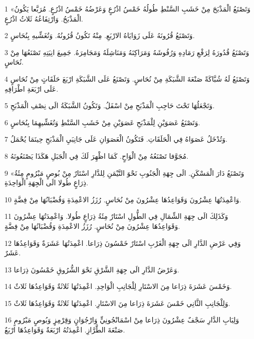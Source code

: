 \par 1 «وَتَصْنَعُ الْمَذْبَحَ مِنْ خَشَبِ السَّنْطِ طُولُهُ خَمْسُ اذْرُعٍ وَعَرْضُهُ خَمْسُ اذْرُعٍ. مُرَبَّعا يَكُونُ الْمَذْبَحُ. وَارْتِفَاعُهُ ثَلاثُ اذْرُعٍ.
\par 2 وَتَصْنَعُ قُرُونَهُ عَلَى زَوَايَاهُ الارْبَعِ. مِنْهُ تَكُونُ قُرُونُهُ. وَتُغَشِّيهِ بِنُحَاسٍ.
\par 3 وَتَصْنَعُ قُدُورَهُ لِرَفْعِ رَمَادِهِ وَرُفُوشَهُ وَمَرَاكِنَهُ وَمَنَاشِلَهُ وَمَجَامِرَهُ. جَمِيعَ انِيَتِهِ تَصْنَعُهَا مِنْ نُحَاسٍ.
\par 4 وَتَصْنَعُ لَهُ شُبَّاكَةً صَنْعَةَ الشَّبَكَةِ مِنْ نُحَاسٍ. وَتَصْنَعُ عَلَى الشَّبَكَةِ ارْبَعَ حَلَقَاتٍ مِنْ نُحَاسٍ عَلَى ارْبَعَةِ اطْرَافِهِ.
\par 5 وَتَجْعَلُهَا تَحْتَ حَاجِبِ الْمَذْبَحِ مِنْ اسْفَلُ. وَتَكُونُ الشَّبَكَةُ الَى نِصْفِ الْمَذْبَحِ.
\par 6 وَتَصْنَعُ عَصَوَيْنِ لِلْمَذْبَحِ عَصَوَيْنِ مِنْ خَشَبِ السَّنْطِ وَتُغَشِّيهِمَا بِنُحَاسٍ.
\par 7 وَتُدْخَلُ عَصَوَاهُ فِي الْحَلَقَاتِ. فَتَكُونُ الْعَصَوَانِ عَلَى جَانِبَيِ الْمَذْبَحِ حِينَمَا يُحْمَلُ.
\par 8 مُجَوَّفا تَصْنَعُهُ مِنْ الْوَاحٍ. كَمَا اظْهِرَ لَكَ فِي الْجَبَلِ هَكَذَا يَصْنَعُونَهُ.
\par 9 «وَتَصْنَعُ دَارَ الْمَسْكَنِ. الَى جِهَةِ الْجَنُوبِ نَحْوَ التَّيْمَنِ لِلدَّارِ اسْتَارٌ مِنْ بُوصٍ مَبْرُومٍ مِئَةُ ذِرَاعٍ طُولا الَى الْجِهَةِ الْوَاحِدَةِ.
\par 10 وَاعْمِدَتُهَا عِشْرُونَ وَقَوَاعِدُهَا عِشْرُونَ مِنْ نُحَاسٍ. رُزَزُ الاعْمِدَةِ وَقُضْبَانُهَا مِنْ فِضَّةٍ.
\par 11 وَكَذَلِكَ الَى جِهَةِ الشِّمَالِ فِي الطُّولِ اسْتَارٌ مِئَةُ ذِرَاعٍ طُولا. وَاعْمِدَتُهَا عِشْرُونَ وَقَوَاعِدُهَا عِشْرُونَ مِنْ نُحَاسٍ. رُزَزُ الاعْمِدَةِ وَقُضْبَانُهَا مِنْ فِضَّةٍ.
\par 12 وَفِي عَرْضِ الدَّارِ الَى جِهَةِ الْغَرْبِ اسْتَارٌ خَمْسُونَ ذِرَاعا. اعْمِدَتُهَا عَشَرَةٌ وَقَوَاعِدُهَا عَشَرٌ.
\par 13 وَعَرْضُ الدَّارِ الَى جِهَةِ الشَّرْقِ نَحْوَ الشُّرُوقِ خَمْسُونَ ذِرَاعا.
\par 14 وَخَمْسَ عَشَرَةَ ذِرَاعا مِنَ الاسْتَارِ لِلْجَانِبِ الْوَاحِدِ. اعْمِدَتُهَا ثَلاثَةٌ وَقَوَاعِدُهَا ثَلاثٌ.
\par 15 وَلِلْجَانِبِ الثَّانِي خَمْسَ عَشَرَةَ ذِرَاعا مِنَ الاسْتَارِ. اعْمِدَتُهَا ثَلاثَةٌ وَقَوَاعِدُهَا ثَلاثٌ.
\par 16 وَلِبَابِ الدَّارِ سَجْفٌ عِشْرُونَ ذِرَاعا مِنْ اسْمَانْجُونِيٍّ وَارْجُوَانٍ وَقِرْمِزٍ وَبُوصٍ مَبْرُومٍ صَنْعَةَ الطَّرَّازِ. اعْمِدَتُهُ ارْبَعَةٌ وَقَوَاعِدُهَا ارْبَعٌ.
